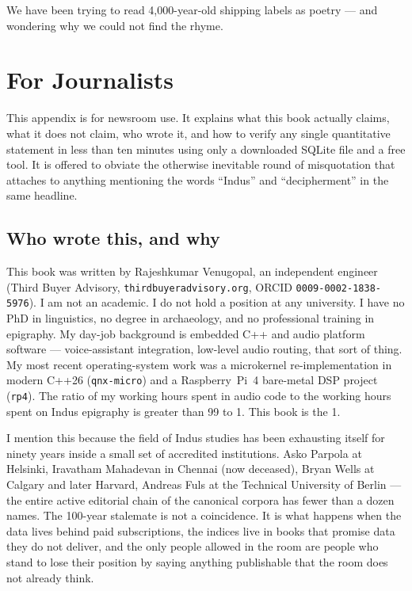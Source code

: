 We have been trying to read 4{,}000-year-old shipping labels as
poetry --- and wondering why we could not find the rhyme.

\clearpage
\section{For Journalists}\label{sec:press}

This appendix is for newsroom use. It explains what this book
actually claims, what it does not claim, who wrote it, and how to
verify any single quantitative statement in less than ten minutes
using only a downloaded SQLite file and a free tool. It is offered
to obviate the otherwise inevitable round of misquotation that
attaches to anything mentioning the words ``Indus'' and
``decipherment'' in the same headline.

\subsection{Who wrote this, and why}

This book was written by Rajeshkumar Venugopal, an independent
engineer (Third Buyer Advisory, \texttt{thirdbuyeradvisory.org},
ORCID \texttt{0009-0002-1838-5976}). I am not an academic. I do
not hold a position at any university. I have no PhD in
linguistics, no degree in archaeology, and no professional
training in epigraphy. My day-job background is embedded C++ and
audio platform software --- voice-assistant integration, low-level
audio routing, that sort of thing. My most recent
operating-system work was a microkernel re-implementation in
modern C++26 (\texttt{qnx-micro}) and a Raspberry~Pi~4 bare-metal
DSP project (\texttt{rp4}). The ratio of my working hours spent
in audio code to the working hours spent on Indus epigraphy is
greater than 99 to 1. This book is the 1.

I mention this because the field of Indus studies has been
exhausting itself for ninety years inside a small set of accredited
institutions. Asko Parpola at Helsinki, Iravatham Mahadevan in
Chennai (now deceased), Bryan Wells at Calgary and later
Harvard, Andreas Fuls at the Technical University of Berlin ---
the entire active editorial chain of the canonical corpora has
fewer than a dozen names. The 100-year stalemate is not a
coincidence. It is what happens when the data lives behind paid
subscriptions, the indices live in books that promise data they
do not deliver, and the only people allowed in the room are people
who stand to lose their position by saying anything publishable
that the room does not already think.

